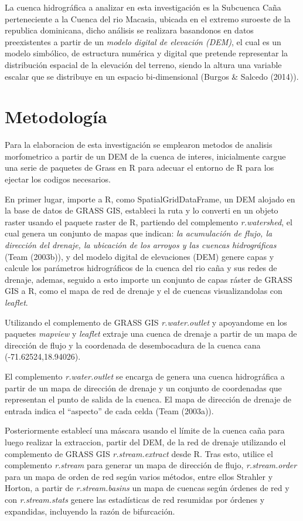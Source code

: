 \documentclass[11pt,]{article}
\begin{document}
La cuenca hidrográfica a analizar en esta investigación es la Subcuenca
Caña perteneciente a la Cuenca del rio Macasia, ubicada en el extremo
suroeste de la republica dominicana, dicho análisis se realizara
basandonos en datos preexistentes a partir de un \emph{modelo digital de
elevación (DEM)}, el cual es un modelo simbólico, de estructura numérica
y digital que pretende representar la distribución espacial de la
elevación del terreno, siendo la altura una variable escalar que se
distribuye en un espacio bi-dimensional (Burgos \& Salcedo (2014)).

\section{Metodología}\label{metodologuxeda}

Para la elaboracion de esta investigación se emplearon metodos de
analisis morfometrico a partir de un DEM de la cuenca de interes,
inicialmente cargue una serie de paquetes de Grass en R para adecuar el
entorno de R para los ejectar los codigos necesarios.

En primer lugar, importe a R, como SpatialGridDataFrame, un DEM alojado
en la base de datos de GRASS GIS, estableci la ruta y lo converti en un
objeto raster usando el paquete raster de R, partiendo del complemento
\emph{r.watershed}, el cual genera un conjunto de mapas que indican:
\emph{la acumulación de flujo, la dirección del drenaje, la ubicación de
los arroyos y las cuencas hidrográficas} (Team (2003b)), y del modelo
digital de elevaciones (DEM) genere capas y calcule los parámetros
hidrográficos de la cuenca del rio caña y sus redes de drenaje, ademas,
seguido a esto importe un conjunto de capas ráster de GRASS GIS a R,
como el mapa de red de drenaje y el de cuencas visualizandolas con
\emph{leaflet}.

Utilizando el complemento de GRASS GIS \emph{r.water.outlet} y
apoyandome en los paquetes \emph{mapview} y \emph{leaflet} extraje una
cuenca de drenaje a partir de un mapa de dirección de flujo y la
coordenada de desembocadura de la cuenca cana (-71.62524,18.94026).

El complemento \emph{r.water.outlet} se encarga de genera una cuenca
hidrográfica a partir de un mapa de dirección de drenaje y un conjunto
de coordenadas que representan el punto de salida de la cuenca. El mapa
de dirección de drenaje de entrada indica el ``aspecto'' de cada celda
(Team (2003a)).

Posteriormente establecí una máscara usando el límite de la cuenca caña
para luego realizar la extraccion, partir del DEM, de la red de drenaje
utilizando el complemento de GRASS GIS \emph{r.stream.extract} desde R.
Tras esto, utilice el complemento \emph{r.stream} para generar un mapa
de dirección de flujo, \emph{r.stream.order} para un mapa de orden de
red según varios métodos, entre ellos Strahler y Horton, a partir de
\emph{r.stream.basins} un mapa de cuencas según órdenes de red y con
\emph{r.stream.stats} genere las estadísticas de red resumidas por
órdenes y expandidas, incluyendo la razón de bifurcación.
\end{document}
